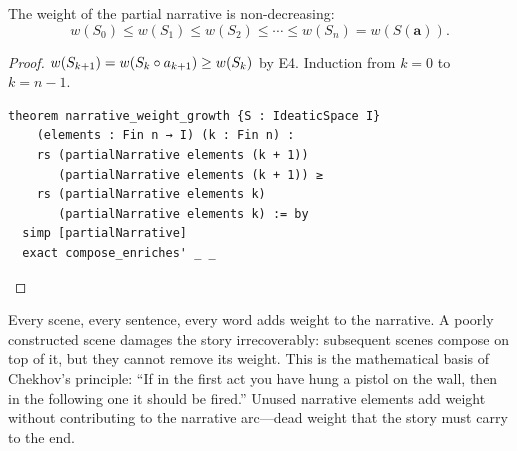 \begin{theorem}
\label{thm:narrative-weight-growth}
The weight of the partial narrative is non-decreasing:
\[
  w(S_0) \leq w(S_1) \leq w(S_2) \leq \cdots \leq w(S_n) = w(S(\mathbf{a})).
\]
\end{theorem}

\begin{proof}
$w(S_{k+1}) = w(S_k \circ a_{k+1}) \geq w(S_k)$ by E4.  Induction
from $k = 0$ to $k = n-1$.

\begin{lstlisting}[caption={Lean 4: Narrative weight growth}]
theorem narrative_weight_growth {S : IdeaticSpace I}
    (elements : Fin n → I) (k : Fin n) :
    rs (partialNarrative elements (k + 1))
       (partialNarrative elements (k + 1)) ≥
    rs (partialNarrative elements k)
       (partialNarrative elements k) := by
  simp [partialNarrative]
  exact compose_enriches' _ _
\end{lstlisting}
\end{proof}

\begin{interpretation}
\label{interp:untell}
Every scene, every sentence, every word adds weight to the narrative.  A
poorly constructed scene damages the story irrecoverably: subsequent scenes
compose on top of it, but they cannot remove its weight.  This is the
mathematical basis of Chekhov's principle: ``If in the first act you have
hung a pistol on the wall, then in the following one it should be fired.''
Unused narrative elements add weight without contributing to the narrative
arc---dead weight that the story must carry to the end.
\end{interpretation}

